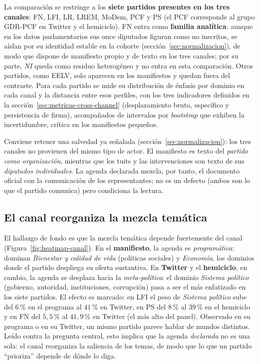La comparación se restringe a los \textbf{siete partidos presentes en los tres
canales}: FN, LFI, LR, LREM, MoDem, PCF y PS (el PCF corresponde al grupo GDR-PCF
en Twitter y el hemiciclo). FN entra como \textbf{familia analítica}: aunque en
los datos parlamentarios sus once diputados figuran como no inscritos, se aíslan
por su identidad estable en la cohorte (sección~\ref{sec:normalizacion}), de modo
que dispone de manifiesto propio y de texto en los tres canales; por su parte,
\emph{NI} queda como residuo heterogéneo y no entra en esta comparación. Otros
partidos, como EELV, solo aparecen en los manifiestos y quedan fuera del
contraste. Para cada partido se mide su distribución de énfasis por dominio en
cada canal y la distancia entre esos perfiles, con los tres indicadores definidos
en la sección~\ref{sec:metricas-cross-channel} (desplazamiento bruto, específico
y persistencia de firma), acompañados de intervalos por \emph{bootstrap} que
exhiben la incertidumbre, crítica en los manifiestos pequeños.

Conviene retener una salvedad ya señalada (sección~\ref{sec:normalizacion}): los
tres canales no provienen del mismo tipo de actor. El manifiesto es texto del
\emph{partido como organización}, mientras que los tuits y las intervenciones son
texto de sus \emph{diputados individuales}. La agenda declarada mezcla, por tanto,
el documento oficial con la comunicación de los representantes; no es un defecto
(ambos son lo que el partido comunica) pero condiciona la lectura.

\subsection{El canal reorganiza la mezcla temática}
\label{sec:res-declarada-patron}

El hallazgo de fondo es que la mezcla temática depende fuertemente del canal
(Figura~\ref{fig:heatmap-canal}). En el \textbf{manifiesto}, la agenda es
\emph{programática}: dominan \emph{Bienestar y calidad de vida} (políticas sociales) y
\emph{Economía}, los dominios donde el partido despliega su oferta sustantiva. En
\textbf{Twitter} y el \textbf{hemiciclo}, en cambio, la agenda se desplaza hacia
la \emph{meta-política}: el dominio \emph{Sistema político} (gobierno, autoridad,
instituciones, corrupción) pasa a ser el más enfatizado en los siete partidos. El
efecto es marcado: en LFI el peso de \emph{Sistema político} sube del $6\,\%$ en
el programa al $41\,\%$ en Twitter, en PS del $8\,\%$ al $39\,\%$ en el hemiciclo
y en FN del $5{,}5\,\%$ al $41{,}9\,\%$ en Twitter (el más alto del panel).
Observado en su programa o en su Twitter, un mismo partido parece hablar de mundos
distintos. Leído contra la pregunta central, esto implica que la agenda
\emph{declarada} no es una sola: el canal reorganiza la saliencia de los temas, de
modo que lo que un partido ``prioriza'' depende de dónde lo diga.

